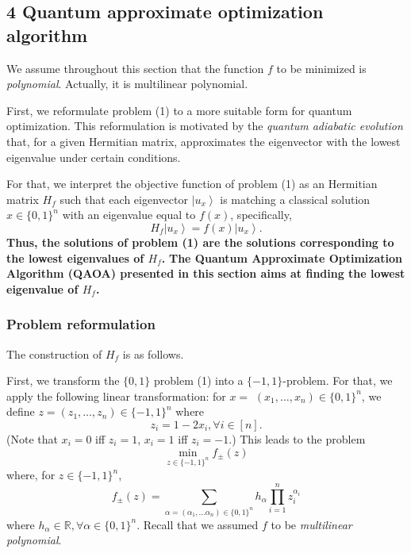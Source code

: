 \subsection{4 Quantum approximate optimization algorithm}

We assume throughout this section that the function $f$ to be minimized is \textit{polynomial}. Actually, it is multilinear polynomial.

First, we reformulate problem (1) to a more suitable form for quantum optimization. This reformulation is motivated by the \textit{quantum adiabatic evolution} that, for a given Hermitian matrix, approximates the eigenvector with the lowest eigenvalue under certain conditions. 

For that, we interpret the objective function of problem (1) as an Hermitian matrix $H_{f}$ such that each eigenvector $\left|u_{x}\right\rangle$ is matching a classical solution $x \in\{0,1\}^{n}$ with an eigenvalue equal to $f(x)$, specifically,
$$
H_{f}\left|u_{x}\right\rangle=f(x)\left|u_{x}\right\rangle .
$$
\textbf{Thus, the solutions of problem (1) are the solutions corresponding to the lowest eigenvalues of $H_{f}$.} \textbf{The Quantum Approximate Optimization Algorithm (QAOA) presented in this section aims at finding the lowest eigenvalue of $H_{f}$.} %

\subsubsection{Problem reformulation}

The construction of $H_{f}$ is as follows. 

First, we transform the $\{0,1\}$ problem (1) into a $\{-1,1\}$-problem. For that, we apply the following linear transformation: for $x=$ $\left(x_{1}, \ldots, x_{n}\right) \in\{0,1\}^{n}$, we define $z=\left(z_{1}, \ldots, z_{n}\right) \in\{-1,1\}^{n}$ where
\begin{equation*}
z_{i}=1-2 x_{i}, \forall i \in[n]. \tag{20}
\end{equation*}
(Note that $x_{i}=0$ iff $z_i=1$, $x_{i}=1$ iff $z_i=-1.$) This leads to the problem
$$
\min _{z \in\{-1,1\}^{n}} f_{ \pm}(z)
$$
where, for $z \in\{-1,1\}^{n}$,
$$
f_{ \pm}(z)=\sum_{\alpha=\left(\alpha_{1}, \ldots \alpha_{n}\right) \in\{0,1\}^{n}} h_{\alpha} \prod_{i=1}^{n} z_{i}^{\alpha_{i}}
$$
where $h_{\alpha} \in \mathbb{R}, \forall \alpha \in\{0,1\}^{n}$. Recall that we assumed $f$ to be \textit{multilinear polynomial}. %

